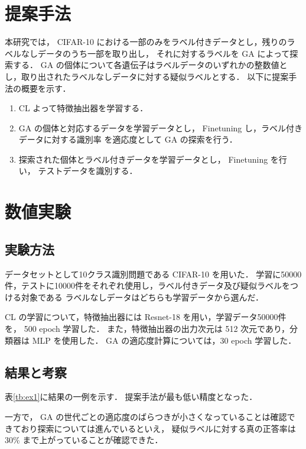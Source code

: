 \documentclass[a4paper,twoside,twocolumn,10pt]{jarticle}     %
\begin{document}
\section{提案手法}
本研究では， CIFAR-10 における一部のみをラベル付きデータとし，残りのラベルなしデータのうち一部を取り出し，
それに対するラベルを GA によって探索する．
GA の個体について各遺伝子はラベルデータのいずれかの整数値とし，取り出されたラベルなしデータに対する疑似ラベルとする．
以下に提案手法の概要を示す．
\begin{enumerate}
	\item CL よって特徴抽出器を学習する．
	\item GA の個体と対応するデータを学習データとし， Finetuning し，ラベル付きデータに対する識別率
	を適応度として GA の探索を行う．
	\item 探索された個体とラベル付きデータを学習データとし， Finetuning を行い，
	テストデータを識別する．
\end{enumerate}
\section{数値実験}
\subsection{実験方法}
データセットとして10クラス識別問題である CIFAR-10 を用いた．
学習に50000件，テストに10000件をそれぞれ使用し，ラベル付きデータ及び疑似ラベルをつける対象である
ラベルなしデータはどちらも学習データから選んだ．

CL の学習について，特徴抽出器には Resnet-18 を用い，学習データ50000件を， 500 epoch 学習した．
また，特徴抽出器の出力次元は 512 次元であり，分類器は MLP を使用した．
GA の適応度計算については，30 epoch 学習した．
\subsection{結果と考察}
表\ref{tb:ex1}に結果の一例を示す． 提案手法が最も低い精度となった．

一方で， GA の世代ごとの適応度のばらつきが小さくなっていることは確認できており探索については進んでいるといえ，
疑似ラベルに対する真の正答率は 30\% まで上がっていることが確認できた．
\end{document}
